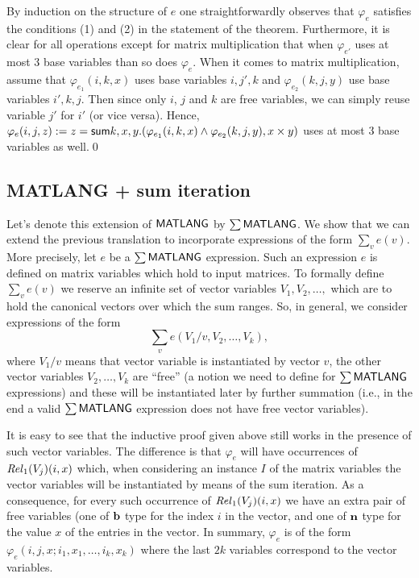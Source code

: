 By induction on the structure of $e$ one straightforwardly observes that $\varphi_e$ satisfies the conditions (1) and (2) in the statement of the theorem.
Furthermore, it is clear for all operations except for matrix multiplication that when $\varphi_{e'}$ uses at most $3$ base variables than so does $\varphi_e$.
When it comes to matrix multiplication, assume that $\varphi_{e_1}(i,k,x)$ uses base variables $i,j',k$ and 
 $\varphi_{e_2}(k,j,y)$ use base variables $i',k,j$. Then since only $i$, $j$ and $k$ are free variables, we can simply reuse variable $j'$ for $i'$ (or vice versa).
 Hence, $\varphi_e(i,j,z):=z = \mathsf{sum} k,x,y . (\varphi_{e_1}(i,k,x) \land \varphi_{e_2}(k,j,y), x \times y)$ uses at most $3$ base variables as well.\qed


\subsection{MATLANG + sum iteration}
Let's denote this extension of $\mathsf{MATLANG}$ by $\sum\mathsf{MATLANG}$.
We show that we can extend the previous translation to incorporate expressions of the form $\sum_v e(v)$. More precisely, let $e$ be a $\sum\mathsf{MATLANG}$ expression. Such an expression $e$ is defined on matrix variables which hold to input matrices. To formally define $\sum_v e(v)$ we reserve an infinite set of vector variables $V_1,V_2,\ldots,$ which are to hold the canonical vectors over which the sum ranges. So, in general, we consider expressions of the form 
$$
\sum_v e(V_1/v,V_2,\ldots,V_k),
$$
where $V_1/v$ means that vector variable is instantiated by vector $v$, the other vector variables $V_2,\ldots,V_k$ are ``free'' (a notion we need to define for $\sum\mathsf{MATLANG}$ expressions) and these will be instantiated later by further summation (i.e., in the end a valid $\sum\mathsf{MATLANG}$ expression does not have free vector variables).

It is easy to see that the inductive proof given above still works in the presence of such vector variables. The difference is that $\varphi_e$ will have occurrences of $\mathit{Rel}_1(V_j)(i,x)$ which, when considering an instance $I$ of the matrix variables the vector variables will be instantiated by means of the sum iteration. As a consequence, for every such occurrence of  $\mathit{Rel}_1(V_j)(i,x)$ we have an extra pair of free variables (one of $\mathbf{b}$ type for the index $i$ in the vector, and one of $\mathbf{n}$ type for the value $x$ of the entries in the vector. In summary, $\varphi_e$ is of the form 
$\varphi_e(i,j,x; i_1,x_1,\ldots,i_k,x_k)$ where the last $2k$ variables correspond to the vector variables.

